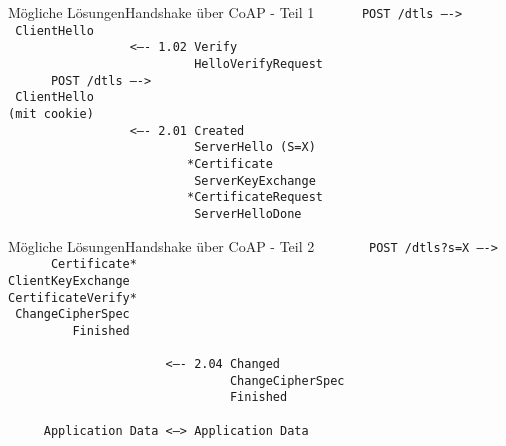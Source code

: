 \documentclass{beamer}
\begin{document}
\begin{frame}{Mögliche Lösungen}{Handshake über CoAP - Teil 1}
  \tt ~~~~~~POST /dtls ---->\\
  \tt ~ClientHello\\
  \tt ~~~~~~~~~~~~~~~~~<---- 1.02 Verify\\
  \tt ~~~~~~~~~~~~~~~~~~~~~~~~~~HelloVerifyRequest\\
  \tt ~~~~~~POST /dtls ---->\\
  \tt ~ClientHello\\
  \tt (mit cookie)\\
  \tt ~~~~~~~~~~~~~~~~~<---- 2.01 Created\\
  \tt ~~~~~~~~~~~~~~~~~~~~~~~~~~ServerHello (S=X)\\
  \tt ~~~~~~~~~~~~~~~~~~~~~~~~~*Certificate\\
  \tt ~~~~~~~~~~~~~~~~~~~~~~~~~~ServerKeyExchange\\
  \tt ~~~~~~~~~~~~~~~~~~~~~~~~~*CertificateRequest\\
  \tt ~~~~~~~~~~~~~~~~~~~~~~~~~~ServerHelloDone
\end{frame}
\begin{frame}{Mögliche Lösungen}{Handshake über CoAP - Teil 2}
  \tt ~~~~~~~POST /dtls?s=X ---->\\
  \tt ~~~~~~Certificate*\\
  \tt ClientKeyExchange\\
  \tt CertificateVerify*\\
  \tt ~ChangeCipherSpec\\
  \tt ~~~~~~~~~Finished\\
  ~\\
  \tt ~~~~~~~~~~~~~~~~~~~~~~<---- 2.04 Changed\\
  \tt ~~~~~~~~~~~~~~~~~~~~~~~~~~~~~~~ChangeCipherSpec\\
  \tt ~~~~~~~~~~~~~~~~~~~~~~~~~~~~~~~Finished\\
  ~\\
  \tt ~~~~~Application Data <---> Application Data
\end{frame}
\end{document}
